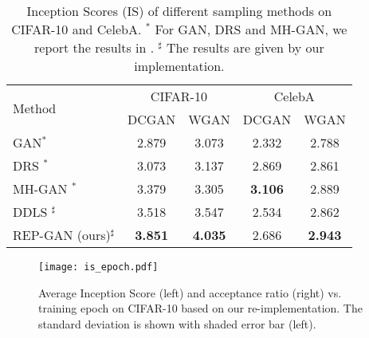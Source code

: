 \documentclass{article} %
\newcommand{\<}{\left\langle}
\renewcommand{\>}{\right\rangle}
\begin{document}
\begin{table}[t]\centering
    \caption{Inception Scores (IS) of different sampling methods on CIFAR-10 and CelebA. $^*$ For GAN, DRS and MH-GAN, we report the results in \cite{turner2019metropolis}. $^\sharp$ The results are given by our implementation.}
    \label{tab:cifar-10-incep-results}
    \begin{tabular}{lcccc}
    \toprule
    \multirow{2}{*}{Method} &  \multicolumn{2}{c}{CIFAR-10} &  \multicolumn{2}{c}{CelebA} \\
    & DCGAN & WGAN & DCGAN & WGAN \\
    \midrule
    GAN$^*$   & 2.879 & 3.073  & 2.332 & 2.788 \\
    DRS \citep{azadi2019discriminator}$^*$ & 3.073 & 3.137 & 2.869 & 2.861 \\
    MH-GAN \citep{turner2019metropolis}$^*$  & 3.379 & 3.305 & \textbf{3.106} & 2.889 \\
    DDLS \citep{che2020your}$^\sharp$ & 3.518 & 3.547 & 2.534 & 2.862 \\    
    REP-GAN (ours)$^\sharp$  & \textbf{3.851} & \textbf{4.035} & 2.686 & \textbf{2.943} \\
    \bottomrule
    \end{tabular}
\end{table}


\begin{figure}[t]\centering
    \texttt{[image: is\_epoch.pdf]}
    \caption{Average Inception Score (left) and acceptance ratio (right) vs. training epoch on CIFAR-10 based on our re-implementation. The standard deviation is shown with shaded error bar (left).}
    \label{fig:is-epochs}
\end{figure}
\end{document}
